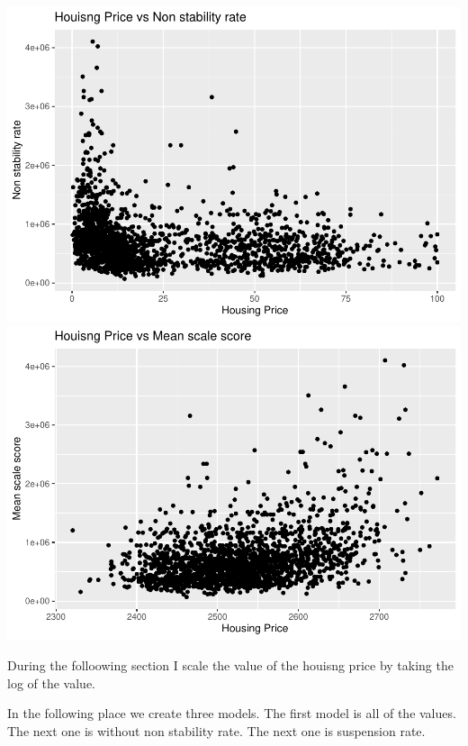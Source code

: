 \documentclass[
]{article}
\begin{document}
\includegraphics{final-writeup_files/figure-latex/unnamed-chunk-3-6.pdf}
\includegraphics{final-writeup_files/figure-latex/unnamed-chunk-3-7.pdf}

During the folloowing section I scale the value of the houisng price by
taking the log of the value.

In the following place we create three models. The first model is all of
the values. The next one is without non stability rate. The next one is
suspension rate.
\end{document}
